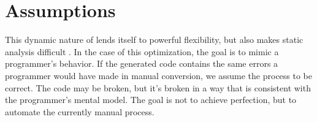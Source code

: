 \section{Assumptions}

This dynamic nature of \javascript lends itself to powerful flexibility, but also makes static analysis difficult \cite{staticanalysis12}.  In the case of this optimization, the goal is to mimic a programmer's behavior.  If the generated code contains the same errors a programmer would have made in manual conversion, we assume the process to be correct.  The code may be broken, but it's broken in a way that is consistent with the programmer's mental model.  The goal is not to achieve perfection, but to automate the currently manual process.  



